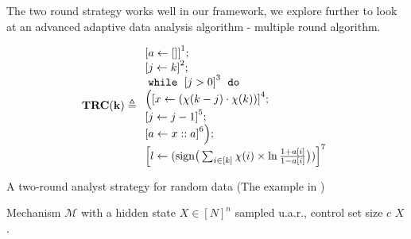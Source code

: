 The two round strategy works well in our framework, we explore further to look at an advanced adaptive data analysis algorithm - multiple round algorithm.
\begin{example}
    \[
        \bf{TRC}(k) \triangleq
    \begin{array}{l}
           \clabel{ a \leftarrow []}^{1} ; \\
            \clabel{\assign{j}{k} }^{2} ; \\
            \ewhile ~ \clabel{j > 0}^{3} ~ \edo ~ \\
            \Big(
             \clabel{x \leftarrow (\chi(k - j)\cdot \chi(k)) }^{4}  ; \\
             \clabel{\assign{j}{j-1}}^{5} ;\\
            \clabel{a \leftarrow x :: a}^{6}       \Big);\\
            \clabel{l \leftarrow (\mathrm{sign}\big (\sum_{i\in [k]} \chi(i)\times\ln\frac{1+a[i]}{1-a[i]} \big ))}^{7}\\
        \end{array}
    \]
    \begin{algorithm}
    \footnotesize
    \caption{A two-round analyst strategy for random data (The example in  \cite{dwork2015preserving})}
    \label{alg:twoRound}
    \begin{algorithmic}
    \REQUIRE Mechanism $\mathcal{M}$ with a hidden state $X\in [N]^{n}$ sampled u.a.r., control set size $c$
    \RETURN $X$.
    \end{algorithmic}
    \end{algorithm}
%
    \end{example}

